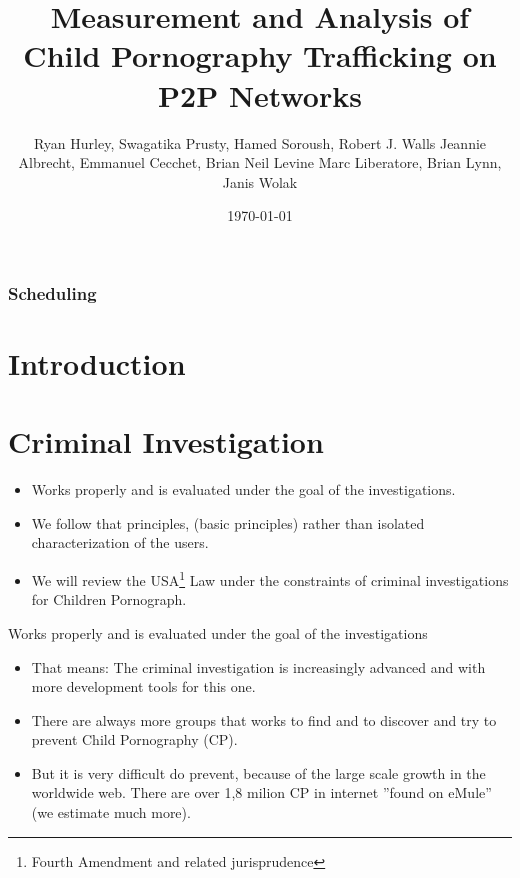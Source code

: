 \documentclass[notes]{beamer}
\title{Measurement and Analysis of Child Pornography Trafficking on P2P Networks\nocite{Hurley}}
\subtitle{}
\institute{Instituto de Computação - Unicamp}
\date{\today}
\author{Ryan Hurley, Swagatika Prusty, Hamed Soroush, Robert J. Walls
Jeannie Albrecht, Emmanuel Cecchet, Brian Neil Levine
Marc Liberatore, Brian Lynn, Janis Wolak}
\begin{document}
\begin{frame}
  \titlepage
\end{frame}

\begin{frame}
  \frametitle{Scheduling}
  \tableofcontents
\end{frame}

\section{Introduction} 
\begin{frame} %

\end{frame}

\section{Criminal Investigation}
\begin{frame}

\begin{itemize} 
    \item[\checkmark] Works properly and is evaluated under the goal of the investigations.
    
    \item[\checkmark] We follow that principles, (basic principles) rather than isolated characterization of the users.
    
    \item[\checkmark] We will review the USA\footnote{Fourth Amendment and related jurisprudence} Law under the constraints of criminal investigations for Children Pornograph.
\end{itemize}

\end{frame}

\begin{frame}
\begin{block}{Works properly and is evaluated under the goal of the investigations}

\begin{itemize}

\item[\checkmark]That  means: The criminal investigation is increasingly advanced and with more development tools for this one. 

\item[\checkmark]There are always more groups that works to find and to discover and try to prevent Child Pornography (CP).

\item[\checkmark]But it is very difficult do prevent, because of the large scale growth in the worldwide web. There are over 1,8 milion CP in internet ''found on eMule'' (we estimate much more).

\end{itemize}

\end{block}

\end{frame}
\end{document}
